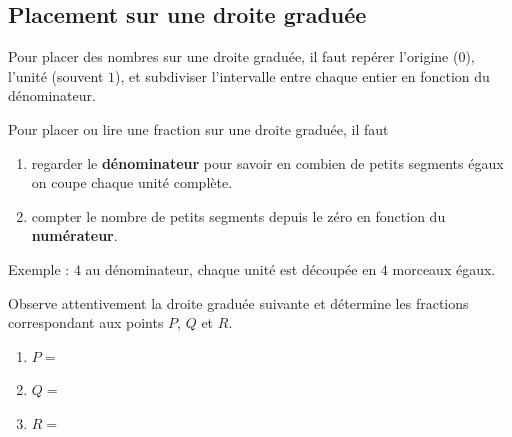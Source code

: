 \documentclass[../../syllabus_1.tex]{subfiles}
\begin{document}
\begin{itemize}
\newpage
\subsection{Placement sur une droite graduée}
 
Pour placer des nombres sur une droite graduée, il faut repérer l'origine ($0$), l'unité (souvent $1$), et subdiviser l'intervalle entre chaque entier en fonction du dénominateur.
 
Pour placer ou lire une fraction sur une droite graduée, il faut
\begin{enumerate}
    \item regarder le \textbf{dénominateur} pour savoir en combien de petits segments égaux on coupe chaque unité complète.
    \item compter le nombre de petits segments depuis le zéro en fonction du \textbf{numérateur}.
\end{enumerate}
 
Exemple : $4$ au dénominateur, chaque unité est découpée en $4$ morceaux égaux.
\begin{center}
\end{center}
 
\begin{exercise}
    Observe attentivement la droite graduée suivante et détermine les fractions correspondant aux points $P$, $Q$ et $R$.
    \begin{center}
    \end{center}
    \begin{enumerate}[cols=3, label=\ ]
        \item $P = $ \dotfill
        \item $Q = $ \dotfill
        \item $R = $ \dotfill
    \end{enumerate}
\end{exercise}
 

\end{itemize}
\end{document}
